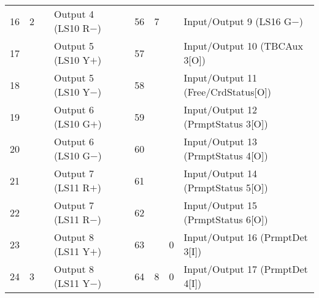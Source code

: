 \documentclass[]{article}
\begin{document}
\begin{landscape}
\begin{table}[ht]
\begin{tabular}{lllllllll}
			16           & \multirow{-8}{*}{2} & \multirow{-8}{*}{} & Output 4 (LS10 R$-$)           &                    & 56                       & \multirow{-8}{*}{7}                        & \multirow{-8}{*}{}                         & Input/Output 9 (LS16 G$-$)                \\ \cline{1-4} \cline{6-9} 
			17           &                     &                    & Output 5 (LS10 Y$+$)           &                    & 57                       &                                            &                                            & Input/Output 10 (TBCAux 3{[}O{]})         \\
			18           &                     &                    & Output 5 (LS10 Y$-$)           &                    & 58                       &                                            &                                            & Input/Output 11 (Free/CrdStatus{[}O{]}) \\
			19           &                     &                    & Output 6 (LS10 G$+$)           &                    & 59                       &                                            &                                            & Input/Output 12 (PrmptStatus 3{[}O{]})    \\
			20           &                     &                    & Output 6 (LS10 G$-$)           &                    & 60                       &                                            &                                            & Input/Output 13 (PrmptStatus 4{[}O{]})    \\
			21           &                     &                    & Output 7 (LS11 R$+$)           &                    & 61                       &                                            &                                            & Input/Output 14 (PrmptStatus 5{[}O{]})    \\
			22           &                     &                    & Output 7 (LS11 R$-$)           &                    & 62                       &                                            & \multirow{-6}{*}{}                         & Input/Output 15 (PrmptStatus 6{[}O{]})    \\ \cline{8-9} 
			23           &                     &                    & Output 8 (LS11 Y$+$)           &                    & 63                       &                                            & 0                                          & Input/Output 16 (PrmptDet 3{[}I{]})       \\
			24           & \multirow{-8}{*}{3} & \multirow{-8}{*}{} & Output 8 (LS11 Y$-$)           &                    & 64                       & \multirow{-8}{*}{8}                        & 0                                          & Input/Output 17 (PrmptDet 4{[}I{]})       \\ \cline{1-4} \cline{6-9} 

\end{tabular}
\end{table}
\end{landscape}
\end{document}
